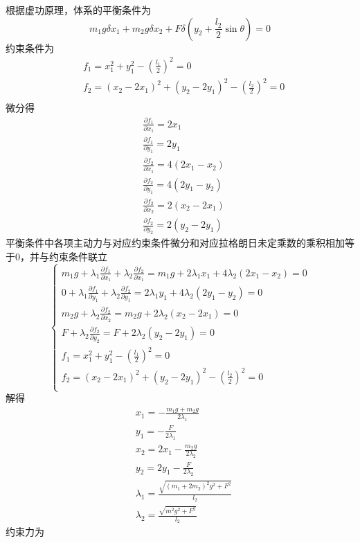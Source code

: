 \documentclass[10pt,a4paper]{article}
\begin{document}
根据虚功原理，体系的平衡条件为
\[
m_1g\delta x_1+m_2g\delta x_2+F\delta(y_2+\frac{l_2}{2}\sin\theta) = 0
\]
约束条件为
\begin{align*}
&f_1 = x_1^2+y_1^2-(\frac{l_1}{2})^2 = 0\\
&f_2 = (x_2-2x_1)^2+(y_2-2y_1)^2-(\frac{l_2}{2})^2 = 0\\
\end{align*}
微分得
\begin{align*}
&\frac{\partial f_1}{\partial x_1} = 2x_1\\
&\frac{\partial f_1}{\partial y_1} = 2y_1\\
&\frac{\partial f_2}{\partial x_1} = 4(2x_1-x_2)\\
&\frac{\partial f_2}{\partial y_1} = 4(2y_1-y_2)\\
&\frac{\partial f_2}{\partial x_2} = 2(x_2-2x_1)\\
&\frac{\partial f_2}{\partial y_2} = 2(y_2-2y_1)
\end{align*}
平衡条件中各项主动力与对应约束条件微分和对应拉格朗日未定乘数的乘积相加等于$0$，并与约束条件联立
\[
\left\{\begin{array}{llllll}
m_1g+\lambda_1\frac{\partial f_1}{\partial x_1}+\lambda_2\frac{\partial f_2}{\partial x_1} = m_1g+2\lambda_1x_1+4\lambda_2(2x_1-x_2) = 0\\
0+\lambda_1\frac{\partial f_1}{\partial y_1}+\lambda_2\frac{\partial f_2}{\partial y_1} = 2\lambda_1y_1+4\lambda_2(2y_1-y_2) = 0\\
m_2g+\lambda_2\frac{\partial f_2}{\partial x_2} = m_2g+2\lambda_2(x_2-2x_1) = 0\\
F+\lambda_2\frac{\partial f_2}{\partial y_2} = F+2\lambda_2(y_2-2y_1) = 0\\
f_1 = x_1^2+y_1^2-(\frac{l_1}{2})^2 = 0\\
f_2 = (x_2-2x_1)^2+(y_2-2y_1)^2-(\frac{l_2}{2})^2 = 0\\
\end{array}\right.
\]
解得
\begin{align*}
&x_1 = -\frac{m_1g+m_2g}{2\lambda_1}\\
&y_1 = -\frac{F}{2\lambda_1}\\
&x_2 = 2x_1-\frac{m_2g}{2\lambda_2}\\
&y_2 = 2y_1-\frac{F}{2\lambda_2}\\
&\lambda_1 = \frac{\sqrt{(m_1+2m_2)^2g^2+F^2}}{l_2}\\
&\lambda_2 = \frac{\sqrt{m^2g^2+F^2}}{l_2}
\end{align*}
约束力为
\end{document}
